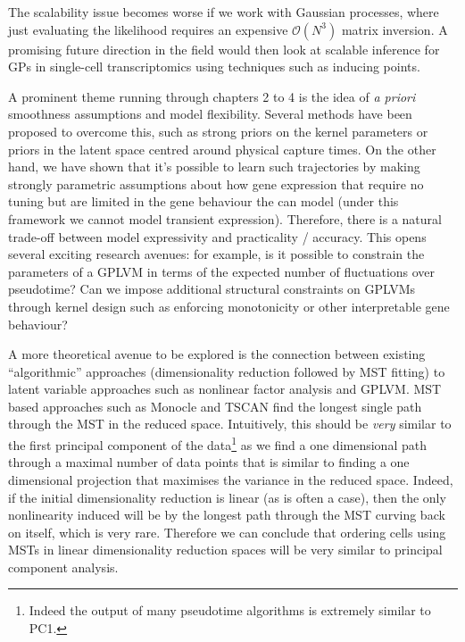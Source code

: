 The scalability issue becomes worse if we work with Gaussian processes, where just evaluating the likelihood requires an expensive $\mathcal{O}(N^3)$ matrix inversion. A promising future direction in the field would then look at scalable inference for GPs in single-cell transcriptomics using techniques such as inducing points.

A prominent theme running through chapters 2 to 4   is the idea of \emph{a priori} smoothness assumptions and model flexibility. %
Several methods have been proposed to overcome this, such as strong priors on the kernel parameters or priors in the latent space centred around physical capture times. On the other hand, we have shown that it's possible to learn such trajectories by making strongly parametric assumptions about how gene expression that require no tuning but are limited in the gene behaviour the can model (under this framework we cannot model transient expression). Therefore, there is a natural trade-off between model expressivity and practicality / accuracy. This opens several exciting research avenues: for example, is it possible to constrain the parameters of a GPLVM in terms of the expected number of fluctuations over pseudotime? Can we impose additional structural constraints on GPLVMs through kernel design such as enforcing monotonicity or other interpretable gene behaviour?

A more theoretical avenue to be explored is the connection between existing ``algorithmic'' approaches (dimensionality reduction followed by MST fitting) to latent variable approaches such as nonlinear factor analysis and GPLVM. MST based approaches such as Monocle and TSCAN find the longest single path through the MST in the reduced space. Intuitively, this should be \emph{very} similar to the first principal component of the data\footnote{
    Indeed the output of many pseudotime algorithms is extremely similar to PC1.
} as we find a one dimensional path through a maximal number of data points that is similar to finding a one dimensional projection that maximises the variance in the reduced space. Indeed, if the initial dimensionality reduction is linear (as is often a case), then the only nonlinearity induced will be by the longest path through the MST curving back on itself, which is very rare. Therefore we can conclude that ordering cells using MSTs in linear dimensionality reduction spaces will be very similar to principal component analysis.

